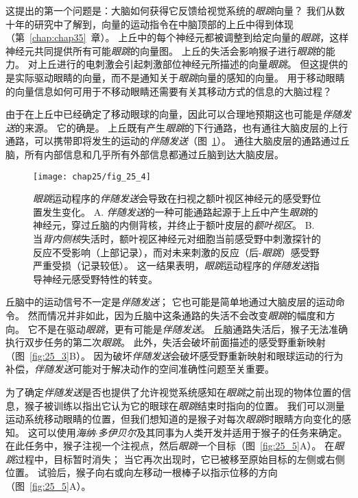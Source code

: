 这提出的第一个问题是：大脑如何获得它反馈给视觉系统的\textit{眼跳}向量？
我们从数十年的研究中了解到，向量的运动指令在中脑顶部的上丘中得到体现（第~\ref{chap:chap35}~章）。
上丘中的每个神经元都被调整到给定向量的\textit{眼跳}，这样神经元共同提供所有可能\textit{眼跳}的向量图。
上丘的失活会影响猴子进行\textit{眼跳}的能力。
对上丘进行的电刺激会引起刺激部位神经元所描述的向量\textit{眼跳}。 
但这提供的是实际驱动眼睛的向量，而不是通知关于\textit{眼跳}向量的感知的向量。
用于移动眼睛的向量信息如何可用于不移动眼睛还需要有关其移动方式的信息的大脑过程？


由于在上丘中已经确定了移动眼球的向量，因此可以合理地预期这也可能是\textit{伴随发送}的来源。
它的确是。
上丘既有产生\textit{眼跳}的下行通路，也有通往大脑皮层的上行通路，可以携带即将发生的运动的\textit{伴随发送}（图~\ref{fig:25_4}）。
通往大脑皮层的通路通过丘脑，所有内部信息和几乎所有外部信息都通过丘脑到达大脑皮层。


\begin{figure}[htbp]
	\centering
	\texttt{[image: chap25/fig\_25\_4]}
	\caption{\textit{眼跳}运动程序的\textit{伴随发送}会导致在扫视之额叶视区神经元的感受野位置发生变化\cite{sommer2008brain}。
		A. \textit{伴随发送}的一种可能通路起源于上丘中产生\textit{眼跳}的神经元，穿过丘脑的内侧背核，并终止于额叶皮层的\textit{额叶视区}。
		B. 当\textit{背内侧核}失活时，额叶视区神经元对细胞当前感受野中刺激探针的反应不受影响（上部记录），而对未来刺激的反应（后-\textit{眼跳}）感受野严重受损（记录较低）。
		这一结果表明，\textit{眼跳}运动程序的\textit{伴随发送}指导神经元感受野特性的转变。}
	\label{fig:25_4}
\end{figure}


丘脑中的运动信号不一定是\textit{伴随发送}；
它也可能是简单地通过大脑皮层的运动命令。
然而情况并非如此，因为丘脑中这条通路的失活不会改变\textit{眼跳}的幅度和方向。
它不是在驱动\textit{眼跳}，更有可能是\textit{伴随发送}。
丘脑通路失活后，猴子无法准确执行双步任务的第二次\textit{眼跳}。
此外，失活会破坏前面描述的感受野重新映射（图~\ref{fig:25_3}B）。
因为破坏\textit{伴随发送}会破坏感受野重新映射和眼球运动的行为补偿，\textit{伴随发送}可能对于解决动作的空间准确性问题至关重要。


为了确定\textit{伴随发送}是否也提供了允许视觉系统感知在\textit{眼跳}之前出现的物体位置的信息，猴子被训练以指出它认为它的眼球在\textit{眼跳}结束时指向的位置。
我们可以测量运动系统移动眼睛的位置，但我们想知道的是猴子对每次\textit{眼跳}时眼睛方向变化的感知。
这可以使用\textit{海纳$\cdot$多伊贝尔}及其同事为人类开发并适用于猴子的任务来确定。
在此任务中，猴子注视一个注视点，然后\textit{眼跳}一个目标（图~\ref{fig:25_5}A）。
在\textit{眼跳}过程中，目标暂时消失；
当它再次出现时，它已被移至原始目标的左侧或右侧位置。
试验后，猴子向右或向左移动一根棒子以指示位移的方向（图~\ref{fig:25_5}A）。



